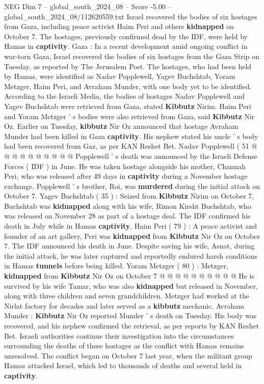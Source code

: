 \begin{textsample}{NEG Dim 7 – global\_south\_2024\_08 – Score -5.00 – global\_south\_2024\_08/112620559.txt}  \label{ex:f7_neg_375}
Israel recovered the bodies of six hostages from Gaza, including peace activist Haim Peri and others \textbf{kidnapped} on October 7.
The hostages, previously confirmed dead by the IDF, were held by Hamas in \textbf{captivity}.
Gaza : In a recent development amid ongoing conflict in war-torn Gaza, Israel recovered the bodies of six hostages from the Gaza Strip on Tuesday, as reported by The Jerusalem Post.
The hostages, who had been held by Hamas, were identified as Nadav Popplewell, Yagev Buchshtab, Yoram Metzger, Haim Peri, and Avraham Munder, with one body yet to be identified.
According to the Israeli Media, the bodies of hostages Nadav Popplewell and Yagev Buchshtab were retrieved from Gaza, stated \textbf{Kibbutz} Nirim.
Haim Peri and Yoram Metzger ' s bodies were also retrieved from Gaza, said \textbf{Kibbutz} Nir Oz.
Earlier on Tuesday, \textbf{kibbutz} Nir Oz announced that hostage Avraham Munder had been killed in Gaza \textbf{captivity}.
His nephew stated his uncle ' s body had been recovered from Gaz, as per KAN Reshet Bet.
Nadav Popplewell ( 51 @ @ @ @ @ @ @ @ @ @ Popplewell ' s death was announced by the Israeli Defense Forces ( IDF ) in June.
He was taken hostage alongside his mother, Channah Peri, who was released after 49 days in \textbf{captivity} during a November hostage exchange.
Popplewell ' s brother, Roi, was \textbf{murdered} during the initial attack on October 7.
Yagev Buchshtab ( 35 ) : Seized from \textbf{Kibbutz} Nirim on October 7, Buchshtab was \textbf{kidnapped} along with his wife, Rimon Kirsht Buchshtab, who was released on November 28 as part of a hostage deal.
The IDF confirmed his death in July while in Hamas \textbf{captivity}.
Haim Peri ( 79 ) : A peace activist and founder of an art gallery, Peri was \textbf{kidnapped} from \textbf{Kibbutz} Nir Oz on October 7.
The IDF announced his death in June.
Despite saving his wife, Asnat, during the initial attack, he was later captured and reportedly endured harsh conditions in Hamas \textbf{tunnels} before being killed.
Yoram Metzger ( 80 ) : Metzger, \textbf{kidnapped} from \textbf{Kibbutz} Nir Oz on October 7 @ @ @ @ @ @ @ @ @ @ He is survived by his wife Tamar, who was also \textbf{kidnapped} but released in November, along with three children and seven grandchildren.
Metzger had worked at the Nirlat factory for decades and later served as a \textbf{kibbutz} mechanic.
Avraham Munder : \textbf{Kibbutz} Nir Oz reported Munder ' s death on Tuesday.
His body was recovered, and his nephew confirmed the retrieval, as per reports by KAN Reshet Bet.
Israeli authorities continue their investigation into the circumstances surrounding the deaths of these hostages as the conflict with Hamas remains unresolved.
The conflict began on October 7 last year, when the militant group Hamas attacked Israel, which led to thousands of deaths and several held in \textbf{captivity}.

\end{textsample}
